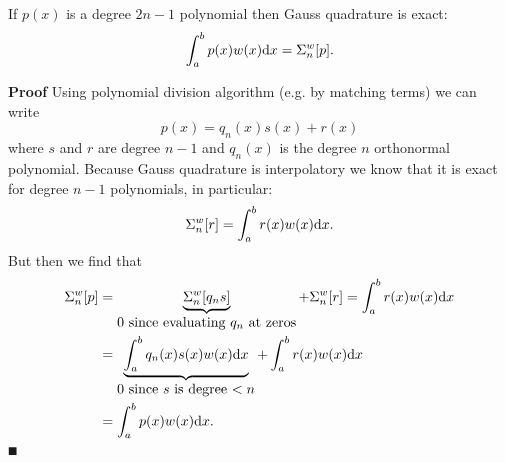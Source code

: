 \begin{theorem} If $p(x)$ is a degree $2n-1$ polynomial then Gauss quadrature is exact:
\[
\ensuremath{\int}_a^b p(x)w(x) {\rm d}x = \ensuremath{\Sigma}_n^w[p].
\]
\end{theorem}
\textbf{Proof} Using polynomial division algorithm (e.g. by matching terms) we can write
\[
p(x) = q_n(x) s(x) + r(x)
\]
where $s$ and $r$ are degree $n-1$ and $q_n(x)$ is the degree $n$ orthonormal polynomial. Because Gauss quadrature is interpolatory we know that it is exact for degree $n-1$ polynomials, in particular:
\[
\ensuremath{\Sigma}_n^w[r] = \ensuremath{\int}_a^b r(x) w(x) {\rm d}x.
\]
But then we find that
\begin{align*}
\ensuremath{\Sigma}_n^w[p] &= \underbrace{\ensuremath{\Sigma}_n^w[q_n s]}_{\hbox{$0$ since evaluating $q_n$ at zeros}} + \ensuremath{\Sigma}_n^w[r] = \ensuremath{\int}_a^b r(x) w(x) {\rm d}x\\
&= \underbrace{\ensuremath{\int}_a^b q_n(x)s(x) w(x) {\rm d}x}_{\hbox{$0$ since $s$ is degree $<n$}}  + \ensuremath{\int}_a^b r(x) w(x) {\rm d}x \\
&= \ensuremath{\int}_a^b p(x)w(x) {\rm d}x.
\end{align*}
\ensuremath{\QED}

